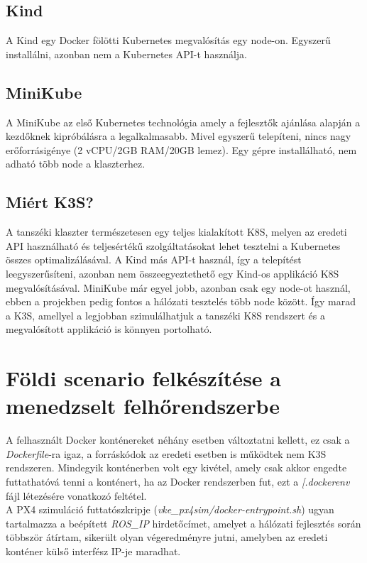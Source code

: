 \subsection{Kind}

A Kind egy Docker fölötti Kubernetes megvalósítás egy node-on. Egyszerű installálni, azonban nem a Kubernetes API-t használja.

\subsection{MiniKube}

A MiniKube az első Kubernetes technológia amely a fejlesztők ajánlása alapján a kezdőknek kipróbálásra a legalkalmasabb. Mivel egyszerű telepíteni, nincs nagy erőforrásigénye (2 vCPU/2GB RAM/20GB lemez). Egy gépre installálható, nem adható több node a klaszterhez. \cite{typesofkubernetes2}

\subsection{Miért K3S?}

A tanszéki klaszter természetesen egy teljes kialakított K8S, melyen az eredeti API használható és teljesértékű szolgáltatásokat lehet tesztelni a Kubernetes összes optimalizálásával. A Kind más API-t használ, így a telepítést leegyszerűsíteni, azonban nem összeegyeztethető egy Kind-os applikáció K8S megvalósításával. MiniKube már egyel jobb, azonban csak egy node-ot használ, ebben a projekben pedig fontos a hálózati tesztelés több node között. Így marad a K3S, amellyel a legjobban szimulálhatjuk a tanszéki K8S rendszert és a megvalósított applikáció is könnyen portolható.

\section{Földi scenario felkészítése a menedzselt felhőrendszerbe}

A felhasznált Docker konténereket néhány esetben változtatni kellett, ez csak a \emph{Dockerfile}-ra igaz, a forráskódok az eredeti esetben is működtek nem K3S rendszeren. Mindegyik konténerben volt egy kivétel, amely csak akkor engedte futtathatóvá tenni a konténert, ha az Docker rendszerben fut, ezt a \emph{[.dockerenv} fájl létezésére vonatkozó feltétel. \\

\noindent
A PX4 szimuláció futtatószkripje (\emph{vke\_px4sim/docker-entrypoint.sh}) ugyan tartalmazza a beépített \emph{ROS\_IP} hirdetőcímet, amelyet a hálózati fejlesztés során többször átírtam, sikerült olyan végeredményre jutni, amelyben az eredeti konténer külső interfész IP-je maradhat. \\

